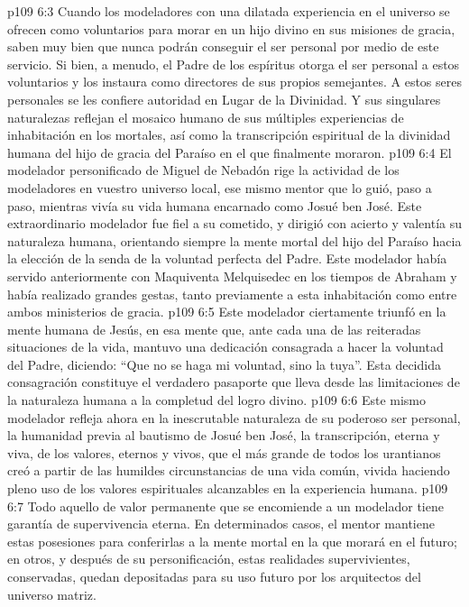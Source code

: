 \vs p109 6:3 Cuando los modeladores con una dilatada experiencia en el universo se ofrecen como voluntarios para morar en un hijo divino en sus misiones de gracia, saben muy bien que nunca podrán conseguir el ser personal por medio de este servicio. Si bien, a menudo, el Padre de los espíritus otorga el ser personal a estos voluntarios y los instaura como directores de sus propios semejantes. A estos seres personales se les confiere autoridad en Lugar de la Divinidad. Y sus singulares naturalezas reflejan el mosaico humano de sus múltiples experiencias de inhabitación en los mortales, así como la transcripción espiritual de la divinidad humana del hijo de gracia del Paraíso en el que finalmente moraron.
\vs p109 6:4 El modelador personificado de Miguel de Nebadón rige la actividad de los modeladores en vuestro universo local, ese mismo mentor que lo guió, paso a paso, mientras vivía su vida humana encarnado como Josué ben José. Este extraordinario modelador fue fiel a su cometido, y dirigió con acierto y valentía su naturaleza humana, orientando siempre la mente mortal del hijo del Paraíso hacia la elección de la senda de la voluntad perfecta del Padre. Este modelador había servido anteriormente con Maquiventa Melquisedec en los tiempos de Abraham y había realizado grandes gestas, tanto previamente a esta inhabitación como entre ambos ministerios de gracia.
\vs p109 6:5 Este modelador ciertamente triunfó en la mente humana de Jesús, en esa mente que, ante cada una de las reiteradas situaciones de la vida, mantuvo una dedicación consagrada a hacer la voluntad del Padre, diciendo: “Que no se haga mi voluntad, sino la tuya”. Esta decidida consagración constituye el verdadero pasaporte que lleva desde las limitaciones de la naturaleza humana a la completud del logro divino.
\vs p109 6:6 Este mismo modelador refleja ahora en la inescrutable naturaleza de su poderoso ser personal, la humanidad previa al bautismo de Josué ben José, la transcripción, eterna y viva, de los valores, eternos y vivos, que el más grande de todos los urantianos creó a partir de las humildes circunstancias de una vida común, vivida haciendo pleno uso de los valores espirituales alcanzables en la experiencia humana.
\vs p109 6:7 Todo aquello de valor permanente que se encomiende a un modelador tiene garantía de supervivencia eterna. En determinados casos, el mentor mantiene estas posesiones para conferirlas a la mente mortal en la que morará en el futuro; en otros, y después de su personificación, estas realidades supervivientes, conservadas, quedan depositadas para su uso futuro por los arquitectos del universo matriz.
